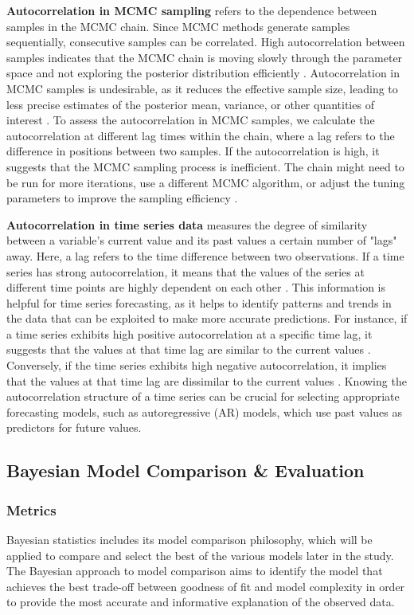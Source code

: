 \textbf{Autocorrelation in MCMC sampling} refers to the dependence between
samples in the MCMC chain. Since MCMC methods generate samples sequentially,
consecutive samples can be correlated. High autocorrelation
between samples indicates that the MCMC chain is moving slowly through the
parameter space and not exploring the posterior distribution efficiently \cite{mcmc}.
Autocorrelation in MCMC samples is undesirable, as it reduces the effective
sample size, leading to less precise estimates of the posterior
mean, variance, or other quantities of interest \cite{mcmc}. To assess the autocorrelation
in MCMC samples, we calculate the autocorrelation at different lag times within
the chain, where a lag refers to the difference in positions between two
samples. If the autocorrelation is high, it suggests that the MCMC sampling
process is inefficient. The chain might need to be run for more iterations, use
a different MCMC algorithm, or adjust the tuning parameters to improve the
sampling efficiency \cite{andrieu2003introduction}.

\textbf{Autocorrelation in time series data} measures the degree of similarity
between a variable's current value and its past values a certain number of
"lags" away. Here, a lag refers to the time difference between two
observations. If a time series has strong autocorrelation, it means that the
values of the series at different time points are highly dependent on each
other \cite{time-series1}. This information is helpful for time series forecasting, as it helps to
identify patterns and trends in the data that can be exploited to make more
accurate predictions. For instance, if a time series exhibits high positive
autocorrelation at a specific time lag, it suggests that the values at that
time lag are similar to the current values \cite{time-series2}. Conversely, if the time series
exhibits high negative autocorrelation, it implies that the values at that time
lag are dissimilar to the current values \cite{time-series2}. Knowing the autocorrelation structure
of a time series can be crucial for selecting appropriate forecasting models,
such as autoregressive (AR) models, which use past values as predictors for
future values.

\subsection{Bayesian Model Comparison \& Evaluation}
\subsubsection{Metrics}
\label{subsec:metrics}
Bayesian statistics includes its model comparison philosophy, which will be applied to compare and select the best of the various models
later in the study. The Bayesian approach to model comparison aims to identify
the model that achieves the best trade-off between goodness of fit and model
complexity in order to provide the most accurate and informative explanation
of the observed data.

